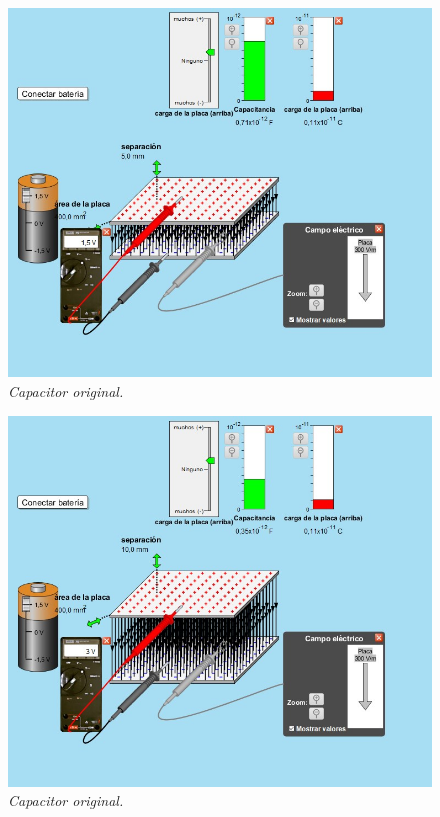 \documentclass[12pt]{report}
\begin{document}
\begin{enumerate}
\begin{enumerate}
      \begin{figure}[h]
          \centering
          \begin{minipage}[h]{0.4\textwidth}
          \centering
          \includegraphics[width=1\textwidth]{./images/3foto4.jpg} 
          \textit{Capacitor original.} 
          \end{minipage}\hskip 1cm
          \begin{minipage}[h]{0.4\textwidth}
          \centering
          \includegraphics[width=1\textwidth]{./images/3foto5.jpg} 
          \textit{Capacitor original.} 
       \end{minipage}
      \end{figure}


\end{enumerate}
\end{enumerate}
\end{document}
